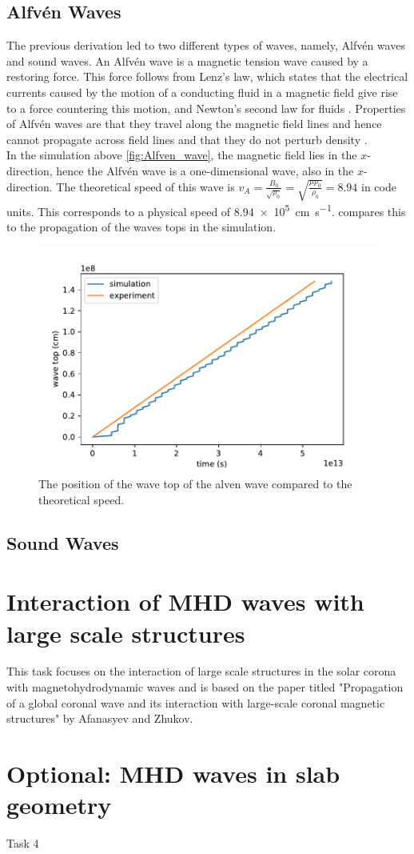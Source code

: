 \documentclass{article}
\begin{document}
\subsection{Alfv\'en Waves}
The previous derivation led to two different types of waves, namely, Alfv\'en waves and sound waves. An Alfv\'en wave is a magnetic tension wave caused by a restoring force. This force follows from Lenz's law, which states that the electrical currents caused by the motion of a conducting fluid in a magnetic field give rise to a force countering this motion, and Newton's second law for fluids \cite{Finlay2007}. Properties of Alfv\'en waves are that they travel along the magnetic field lines and hence cannot propagate across field lines and that they do not perturb density \cite{mhdppt}.\\

In the simulation above \cref{fig:Alfven_wave}, the magnetic field lies in the $x$-direction, hence the Alfv\'en wave is a one-dimensional wave, also in the $x$-direction. The theoretical speed of this wave is $v_A = \frac{B_0}{\sqrt{\rho_0}} = \sqrt{\frac{\mu p_0}{\rho_0}} = 8.94$ in code units. This corresponds to a physical speed of \SI{8.94e5}{\centi\meter\per\second}.
 compares this to the propagation of the waves tops in the simulation.
\begin{figure}[h]
	\centering
	\includegraphics[width=.6\textwidth]{figures/alven_wave_position.pdf}
	\caption{The position of the wave top of the alven wave compared to the theoretical speed.}
	\label{fig:alven_wave_speed}
\end{figure}
\subsection{Sound Waves}
\section{Interaction of MHD waves with large scale structures}
This task focuses on the interaction of large scale structures in the solar corona with magnetohydrodynamic waves and is based on the paper titled "Propagation of a global coronal wave and its interaction with large-scale coronal magnetic structures" by Afanasyev and Zhukov. 
\section{Optional: MHD waves in slab geometry}
Task 4
\printbibliography
\end{document}
